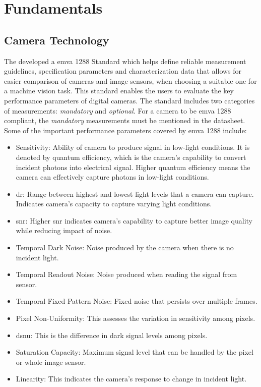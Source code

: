 \chapter{Fundamentals}\label{chap:fundamentals}

    \section{Camera Technology}

    The  developed a \gls{emva} 1288 Standard which helps define reliable measurement guidelines, specification parameters and characterization data that allows for easier comparison of cameras and image sensors, when choosing a suitable one for a machine vision task. This standard enables the users to evaluate the key performance parameters of digital cameras. The standard includes two categories of measurements: \emph{mandatory} and \emph{optional}. For a camera to be \gls{emva} 1288 compliant, the \emph{mandatory} measurements must be mentioned in the datasheet. Some of the important performance parameters covered by \gls{emva} 1288 include:
    \begin{itemize}
        \item Sensitivity: Ability of camera to produce signal in low-light conditions. It is denoted by quantum efficiency, which is the camera's capability to convert incident photons into electrical signal. Higher quantum efficiency means the camera can effectively capture photons in low-light conditions. 
        \item \gls{dr}: Range between highest and lowest light levels that a camera can capture. Indicates camera's capacity to capture varying light conditions.
        \item \gls{snr}: Higher \gls{snr} indicates camera's capability to capture better image quality while reducing impact of noise.
        \item Temporal Dark Noise: Noise produced by the camera when there is no incident light.
        \item Temporal Readout Noise: Noise produced when reading the signal from sensor.
        \item Temporal Fixed Pattern Noise: Fixed noise that persists over multiple frames. 
        \item Pixel Non-Uniformity: This assesses the variation in sensitivity among pixels.
        \item \gls{dsnu}: This is the difference in dark signal levels among pixels.
        \item Saturation Capacity: Maximum signal level that can be handled by the pixel or whole image sensor.
        \item Linearity: This indicates the camera's response to change in incident light.
    \end{itemize}   

